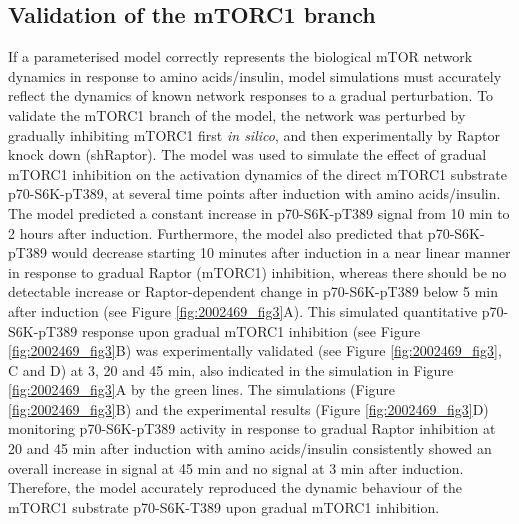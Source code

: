 \subsection{Validation of the mTORC1 branch}
\label{paper1-subsec:Validation of the mTORC1 branch}
If a parameterised model correctly represents the biological mTOR network dynamics in response to amino acids/insulin, model simulations must accurately reflect the dynamics of known network responses to a gradual perturbation. To validate the mTORC1 branch of the model, the network was perturbed by gradually inhibiting mTORC1 first \emph{in silico}, and then experimentally by Raptor knock down (shRaptor). The model was used to simulate the effect of gradual mTORC1 inhibition on the activation dynamics of the direct mTORC1 substrate p70-S6K-pT389, at several time points after induction with amino acids/insulin. \\
The model predicted a constant increase in p70-S6K-pT389 signal from 10 min to 2 hours after induction. Furthermore, the model also predicted that p70-S6K-pT389 would decrease starting 10 minutes after induction in a near linear manner in response to gradual Raptor (mTORC1) inhibition, whereas there should be no detectable increase or Raptor-dependent change in p70-S6K-pT389 below 5 min after induction (see Figure \ref{fig:2002469_fig3}A). This simulated quantitative p70-S6K-pT389 response upon gradual mTORC1 inhibition (see Figure \ref{fig:2002469_fig3}B) was experimentally validated (see Figure \ref{fig:2002469_fig3}, C and D) at 3, 20 and 45 min, also indicated in the simulation in Figure \ref{fig:2002469_fig3}A by the green lines. The simulations (Figure \ref{fig:2002469_fig3}B) and the experimental results (Figure \ref{fig:2002469_fig3}D) monitoring p70-S6K-pT389 activity in response to gradual Raptor inhibition at 20 and 45 min after induction with amino acids/insulin consistently showed an overall 
increase in signal at 45 min and no signal at 3 min after induction. \\
Therefore, the model accurately reproduced the dynamic behaviour of the mTORC1 substrate p70-S6K-T389 upon gradual mTORC1 inhibition.

